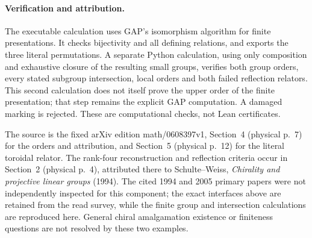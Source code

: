 \documentclass[11pt,a4paper]{article}
\begin{document}
\paragraph{Verification and attribution.}
The executable calculation uses GAP's isomorphism algorithm for finite
presentations. It checks bijectivity and all defining relations, and
exports the three literal permutations. A separate Python calculation,
using only composition and exhaustive closure of the resulting small
groups, verifies both group orders, every stated subgroup intersection,
local orders and both failed reflection relators. This second calculation
does not itself prove the upper order of the finite presentation; that
step remains the explicit GAP computation. A damaged marking is rejected.
These are computational checks, not Lean certificates.

The source is the fixed arXiv edition math/0608397v1, Section~4 (physical
p.~7) for the orders and attribution, and Section~5 (physical p.~12)
for the literal toroidal relator. The rank-four reconstruction and
reflection criteria occur in Section~2 (physical p.~4), attributed there
to Schulte--Weiss, \emph{Chirality and projective linear groups} (1994).
The cited 1994 and 2005 primary papers were not independently inspected
for this component; the exact interfaces above are retained from the
read survey, while the finite group and intersection calculations are
reproduced here. General chiral amalgamation existence or finiteness
questions are not resolved by these two examples.
\end{document}
